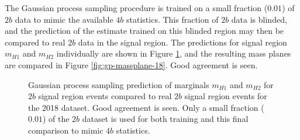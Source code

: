 The Gaussian process sampling procedure is trained on a small fraction ($0.01$) of $2b$ data to mimic 
the available $4b$ statistics. This fraction of $2b$ data is blinded, and the prediction of the estimate trained on 
this blinded region may then be compared to real $2b$ data in the signal region. The 
predictions for signal region $m_{H1}$ and $m_{H2}$ individually are shown in 
Figure \ref{fig:gp-marginals-18}, and the resulting mass planes are compared in Figure \ref{fig:gp-massplane-18}.  Good agreement is seen.
\begin{figure}[ht]
	\centering
	\caption{\label{fig:gp-marginals-18} Gaussian process sampling prediction of marginals $m_{H1}$ and $m_{H2}$ 
	for $2b$ signal region events compared to real $2b$ signal region events for the 2018 dataset. Good agreement 
	is seen. Only a small fraction ($0.01$) of the $2b$ dataset is used for both training and this final 
	comparison to mimic $4b$ statistics.}
\end{figure}

